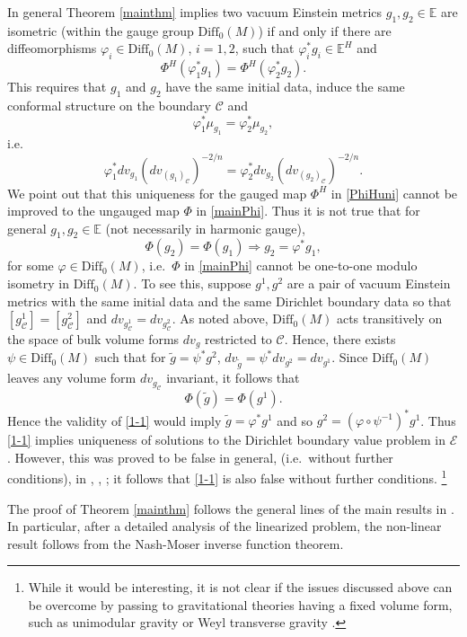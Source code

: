 \documentclass[10pt]{amsart}
\newcommand{\f}{\varphi}
\newcommand{\cC}{{\mathcal C}}
\newcommand{\cE}{{\mathcal E}}
\newcommand{\bE}{\mathbb E}
\newcommand{\Diff}{\mathrm{Diff}}
\newcommand{\be}{\begin{equation}}
\newcommand{\ee}{\end{equation}}
\newcommand{\<}{\langle}
\renewcommand{\>}{\rangle}
\newcommand{\w}{\widetilde}
\theoremstyle{plain}
\theoremstyle{remark}
\theoremstyle{definition}
\numberwithin{equation}{section}
\begin{document}
    In general Theorem \ref{mainthm} implies two vacuum Einstein metrics $g_1, g_2 \in \bE$ are isometric (within the gauge group $\Diff_0(M)$) if and only 
 if there are diffeomorphisms $\f_i \in \Diff_0(M)$, $i = 1,2$, such that $\f_i^* g_i \in \bE^H$ and 
\be \label{PhiHuni}
\Phi^H(\f_1^*g_1) = \Phi^H(\f_2^*g_2).
\ee
This requires that $g_1$ and $g_2$ have the same initial data, induce the same conformal structure on the boundary $\cC$ and  
$$\f_1^* \mu_{g_1} = \f_2^*\mu_{g_2},$$
i.e.~
$$\f_1^*dv_{g_1} (dv_{(g_1)_{\cC}})^{-2/n} = \f_2^*dv_{g_2}(dv_{(g_2)_{\cC}})^{-2/n}.$$
We point out that this uniqueness for the gauged map $\Phi^H$ in \eqref{PhiHuni} cannot be improved to the ungauged map $\Phi$ in \eqref{mainPhi}.  
Thus it is not true that for general $g_1, g_2 \in \bE$ (not necessarily in harmonic gauge), 
\be \label{1-1}
\Phi(g_2) = \Phi(g_1) \Rightarrow g_2 = \f^*g_1,
\ee
for some $\f \in \Diff_0(M)$, i.e.~$\Phi$ in \eqref{mainPhi} cannot be one-to-one modulo isometry in $\Diff_0(M)$. To see this, suppose $g^1, g^2$ are 
a pair of vacuum Einstein metrics with the same initial data and the same Dirichlet boundary data so that $[g^1_{\cC}] = [g^2_{\cC}]$ and $dv_{g^1_{\cC}} = 
dv_{g^2_{\cC}}$.  As noted above, $\Diff_0(M)$ acts transitively on the space of bulk volume forms $dv_g$ restricted to $\cC$. Hence, there exists $\psi \in \Diff_0(M)$ 
such that for $\w g = \psi^*g^2$, $dv_{\w g} = \psi^*dv_{g^2} = dv_{g^1}$. Since $\Diff_0(M)$ leaves any volume form $dv_{g_{\cC}}$ invariant, it follows that 
$$\Phi(\w g) = \Phi(g^1).$$
Hence the validity of \eqref{1-1} would imply $\w g = \f^* g^1$ and so $g^2 = (\f \circ \psi^{-1})^*g^1$. Thus \eqref{1-1} implies uniqueness of solutions to the Dirichlet 
boundary value problem in $\cE$. However, this was proved to be false in general, (i.e.~without further conditions), in \cite{I}, \cite{AA2}, \cite{AGM}; it follows 
that \eqref{1-1} is also false without further conditions. \footnote{While it would be interesting, it is not clear if the issues discussed above can be overcome by 
passing to gravitational theories having a fixed volume form, such as unimodular gravity \cite{UG} or Weyl transverse gravity \cite{OR}.} 

\medskip


   The proof of Theorem \ref{mainthm} follows the general lines of the main results in \cite{I}. In particular, after a detailed analysis of the linearized problem, 
the non-linear result follows from the Nash-Moser inverse function theorem. 

\medskip 
\end{document}
